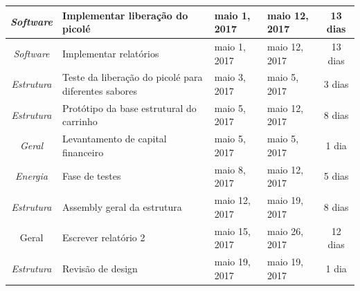 \begin{longtable}{|c|m{6.5cm}|m{3.2cm}|m{3.2cm}|c|}
\textit{Software}                                                         & Implementar liberação do picolé                      & maio 1, 2017                         & maio 12, 2017                     & 13 dias                               \\ \hline
\textit{Software}                                                         & Implementar relatórios                               & maio 1, 2017                         & maio 12, 2017                     & 13 dias                               \\ \hline
\textit{Estrutura}                                                        & Teste da liberação do picolé para diferentes sabores & maio 3, 2017                         & maio 5, 2017                      & 3 dias                                \\ \hline
\textit{Estrutura}                                                        & Protótipo da base estrutural do carrinho             & maio 5, 2017                         & maio 12, 2017                     & 8 dias                                \\ \hline
\textit{Geral}                                                            & Levantamento de capital financeiro                   & maio 5, 2017                         & maio 5, 2017                      & 1 dia                                 \\ \hline
\textit{Energia}                                                          & Fase de testes                                       & maio 8, 2017                         & maio 12, 2017                     & 5 dias                                \\ \hline
\textit{Estrutura}                                                        & Assembly geral da estrutura                          & maio 12, 2017                        & maio 19, 2017                     & 8 dias                                \\ \hline
Geral                                                                     & Escrever relatório 2                                 & maio 15, 2017                        & maio 26, 2017                     & 12 dias                               \\ \hline
\textit{Estrutura}                                                        & Revisão de design                                    & maio 19, 2017                        & maio 19, 2017                     & 1 dia                                 \\ \hline

\end{longtable}

